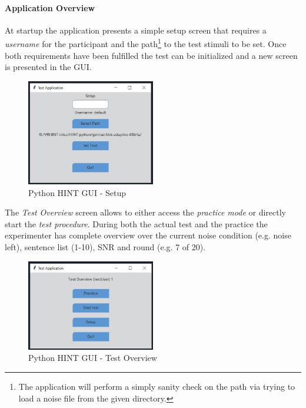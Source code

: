 \documentclass[a4paper,11pt]{article}%
\renewcommand{\\}{\vspace*{0.5\baselineskip} \newline}
\begin{document}
\paragraph{Application Overview} At startup the application presents a simple setup screen that requires a \textit{username} for the participant and the path\footnote{The application will perform a simply sanity check on the path via trying to load a noise file from the given directory.} to the test stimuli to be set. Once both requirements have been fulfilled the test can be initialized and a new screen is presented in the \ac{GUI}.
\begin{figure}[h!]
	\centering
	\includegraphics[width=0.5\textwidth]{PythonHINT-Setup.png}
	\caption{Python HINT GUI - Setup}
	\label{fig:pyhint-setup}
\end{figure}
\newline
\newline
The \textit{Test Overview} screen allows to either access the \textit{practice mode} or directly start the \textit{test procedure}. During both the actual test and the practice the experimenter has complete overview over the current noise condition (e.g. \dq noise left\dq{}), sentence list (1-10), \ac{SNR} and round (e.g. 7 of 20).
\begin{figure}[h!]
	\centering
	\includegraphics[width=0.5\textwidth]{PythonHINT-Overview.png}
	\caption{Python HINT GUI - Test Overview}
	\label{fig:pyhint-overview}
\end{figure}
\end{document}
